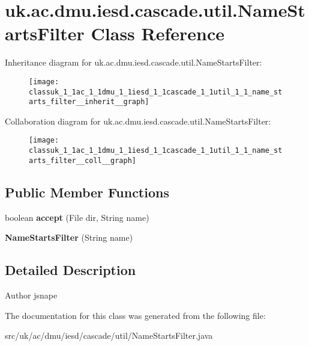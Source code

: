\hypertarget{classuk_1_1ac_1_1dmu_1_1iesd_1_1cascade_1_1util_1_1_name_starts_filter}{\section{uk.\-ac.\-dmu.\-iesd.\-cascade.\-util.\-Name\-Starts\-Filter Class Reference}
\label{classuk_1_1ac_1_1dmu_1_1iesd_1_1cascade_1_1util_1_1_name_starts_filter}
}


Inheritance diagram for uk.\-ac.\-dmu.\-iesd.\-cascade.\-util.\-Name\-Starts\-Filter\-:\nopagebreak
\begin{figure}[H]
\begin{center}
\leavevmode
\texttt{[image: classuk\_1\_1ac\_1\_1dmu\_1\_1iesd\_1\_1cascade\_1\_1util\_1\_1\_name\_starts\_filter\_\_inherit\_\_graph]}
\end{center}
\end{figure}


Collaboration diagram for uk.\-ac.\-dmu.\-iesd.\-cascade.\-util.\-Name\-Starts\-Filter\-:\nopagebreak
\begin{figure}[H]
\begin{center}
\leavevmode
\texttt{[image: classuk\_1\_1ac\_1\_1dmu\_1\_1iesd\_1\_1cascade\_1\_1util\_1\_1\_name\_starts\_filter\_\_coll\_\_graph]}
\end{center}
\end{figure}
\subsection*{Public Member Functions}
\begin{DoxyCompactItemize}
\item 
\hypertarget{classuk_1_1ac_1_1dmu_1_1iesd_1_1cascade_1_1util_1_1_name_starts_filter_ac36e89bf8c497290efbbcd844fc0d72b}{boolean {\bfseries accept} (File dir, String name)}\label{classuk_1_1ac_1_1dmu_1_1iesd_1_1cascade_1_1util_1_1_name_starts_filter_ac36e89bf8c497290efbbcd844fc0d72b}

\item 
\hypertarget{classuk_1_1ac_1_1dmu_1_1iesd_1_1cascade_1_1util_1_1_name_starts_filter_a8d39dcee4eb2b260d9769569b51efd0d}{{\bfseries Name\-Starts\-Filter} (String name)}\label{classuk_1_1ac_1_1dmu_1_1iesd_1_1cascade_1_1util_1_1_name_starts_filter_a8d39dcee4eb2b260d9769569b51efd0d}

\end{DoxyCompactItemize}


\subsection{Detailed Description}
\begin{DoxyAuthor}{Author}
jsnape 
\end{DoxyAuthor}


The documentation for this class was generated from the following file\-:\begin{DoxyCompactItemize}
\item 
src/uk/ac/dmu/iesd/cascade/util/Name\-Starts\-Filter.\-java\end{DoxyCompactItemize}
